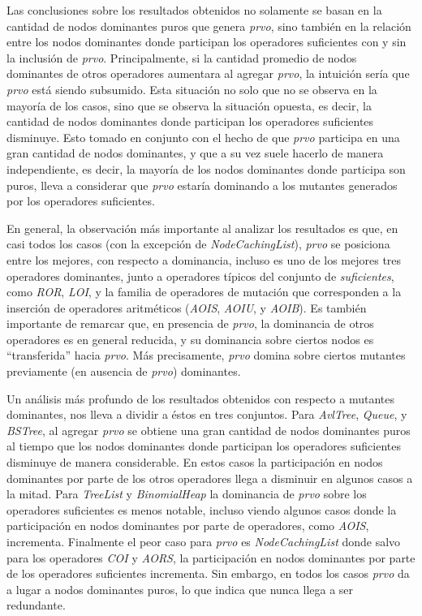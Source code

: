 Las conclusiones sobre los resultados obtenidos no solamente se basan en la cantidad de nodos dominantes puros que genera \emph{prvo}, sino tambi\'en en la relaci\'on entre los nodos dominantes donde participan los operadores suficientes con y sin la inclusi\'on de \emph{prvo}. Principalmente, si la cantidad promedio de nodos dominantes de otros operadores aumentara al agregar \emph{prvo}, la intuici\'on ser\'ia que \emph{prvo} est\'a siendo subsumido. Esta situaci\'on no solo que no se observa en la mayor\'ia de los casos, sino que se observa la situaci\'on opuesta, es decir, la cantidad de nodos dominantes donde participan los operadores suficientes disminuye. Esto tomado en conjunto con el hecho de que \emph{prvo} participa en una gran cantidad de nodos dominantes, y que a su vez suele hacerlo de manera independiente, es decir, la mayor\'ia de los nodos dominantes donde participa son puros, lleva a considerar que \emph{prvo} estar\'ia dominando a los mutantes generados por los operadores suficientes.

En general, la observaci\'on m\'as importante al analizar los resultados es que, en casi todos los casos (con la excepci\'on de \emph{NodeCachingList}), \emph{prvo} se posiciona entre los mejores, con respecto a dominancia, incluso es uno de los mejores tres operadores dominantes, junto a operadores t\'ipicos del conjunto de \emph{suficientes}, como \emph{ROR}, \emph{LOI}, y la familia de operadores de mutaci\'on que corresponden a la inserci\'on de operadores aritm\'eticos (\emph{AOIS}, \emph{AOIU}, y \emph{AOIB}). Es tambi\'en importante de remarcar que, en presencia de \emph{prvo}, la dominancia de otros operadores es en general reducida, y su dominancia sobre ciertos nodos es ``transferida'' hacia \emph{prvo}. M\'as precisamente, \emph{prvo} domina sobre ciertos mutantes previamente (en ausencia de \emph{prvo}) dominantes.

Un an\'alisis m\'as profundo de los resultados obtenidos con respecto a mutantes dominantes, nos lleva a dividir a \'estos en tres conjuntos. Para \emph{AvlTree}, \emph{Queue}, y \emph{BSTree}, al agregar \emph{prvo} se obtiene una gran cantidad de nodos dominantes puros al tiempo que los nodos dominantes donde participan los operadores suficientes disminuye de manera considerable. En estos casos la participaci\'on en nodos dominantes por parte de los otros operadores llega a disminuir en algunos casos a la mitad. Para \emph{TreeList} y \emph{BinomialHeap} la dominancia de \emph{prvo} sobre los operadores suficientes es menos notable, incluso viendo algunos casos donde la participaci\'on en nodos dominantes por parte de operadores, como \emph{AOIS}, incrementa. Finalmente el peor caso para \emph{prvo} es \emph{NodeCachingList} donde salvo para los operadores \emph{COI} y \emph{AORS}, la participaci\'on en nodos dominantes por parte de los operadores suficientes incrementa. Sin embargo, en todos los casos \emph{prvo} da a lugar a nodos dominantes puros, lo que indica que nunca llega a ser redundante.

